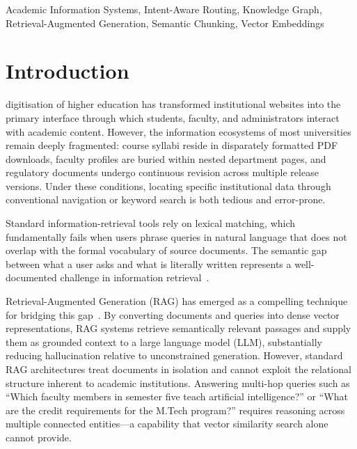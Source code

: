 \documentclass{ieeeaccess}
\begin{document}
\begin{keywords}
Academic Information Systems, Intent-Aware Routing, Knowledge Graph, Retrieval-Augmented Generation, Semantic Chunking, Vector Embeddings
\end{keywords}

\titlepgskip=-15pt

\maketitle

\section{Introduction}
\label{sec:introduction}

 digitisation of higher education has transformed institutional websites into the primary interface through which students, faculty, and administrators interact with academic content. However, the information ecosystems of most universities remain deeply fragmented: course syllabi reside in disparately formatted PDF downloads, faculty profiles are buried within nested department pages, and regulatory documents undergo continuous revision across multiple release versions. Under these conditions, locating specific institutional data through conventional navigation or keyword search is both tedious and error-prone.

Standard information-retrieval tools rely on lexical matching, which fundamentally fails when users phrase queries in natural language that does not overlap with the formal vocabulary of source documents. The semantic gap between what a user asks and what is literally written represents a well-documented challenge in information retrieval~\cite{b1}.

Retrieval-Augmented Generation (RAG) has emerged as a compelling technique for bridging this gap~\cite{b3}. By converting documents and queries into dense vector representations, RAG systems retrieve semantically relevant passages and supply them as grounded context to a large language model (LLM), substantially reducing hallucination relative to unconstrained generation. However, standard RAG architectures treat documents in isolation and cannot exploit the relational structure inherent to academic institutions. Answering multi-hop queries such as ``Which faculty members in semester five teach artificial intelligence?'' or ``What are the credit requirements for the M.Tech program?'' requires reasoning across multiple connected entities---a capability that vector similarity search alone cannot provide.
\end{document}
